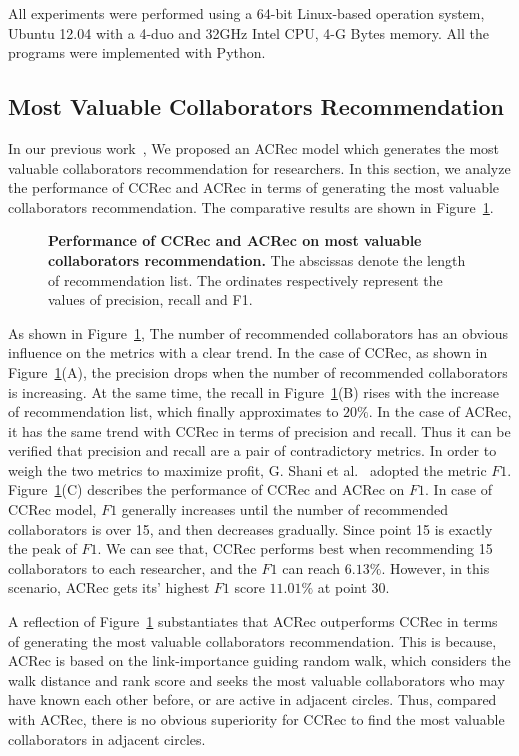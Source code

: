 \documentclass[10pt,letterpaper]{article}
\begin{document}
All experiments were performed using a 64-bit Linux-based operation system, Ubuntu 12.04 with a 4-duo and 32GHz Intel CPU, 4-G Bytes memory. All the programs were implemented with Python.

\subsection*{Most Valuable Collaborators Recommendation}
In our previous work~\cite{li2014acrec}, We proposed an ACRec model which generates the most valuable collaborators recommendation for researchers. In this section, we analyze the performance of CCRec and ACRec in terms of generating the most valuable collaborators recommendation. The comparative results are shown in Figure~\ref{Fig. 3}.

\begin{figure}[!hbt]
\caption{{\bf Performance of CCRec and ACRec on most valuable collaborators recommendation.} The abscissas denote the length of recommendation list. The ordinates respectively represent the values of precision, recall and F1.}
\label{Fig. 3}
\end{figure}

As shown in Figure~\ref{Fig. 3}, The number of recommended collaborators has an obvious influence on the metrics with a clear trend. In the case of CCRec, as shown in Figure~\ref{Fig. 3}(A), the precision drops when the number of recommended collaborators is increasing. At the same time, the recall in Figure~\ref{Fig. 3}(B) rises with the increase of recommendation list, which finally approximates to $20\%$. In the case of ACRec, it has the same trend with CCRec in terms of precision and recall. Thus it can be verified that precision and recall are a pair of contradictory metrics. In order to weigh the two metrics to maximize profit, G. Shani et al.~\cite{shani2011evaluating} adopted the metric $F1$. Figure~\ref{Fig. 3}(C) describes the performance of CCRec and ACRec on $F1$. In case of CCRec model, $F1$ generally increases until the number of recommended collaborators is over 15, and then decreases gradually. Since point 15 is exactly the peak of $F1$. We can see that, CCRec performs best when recommending 15 collaborators to each researcher, and the $F1$ can reach $6.13\%$. However, in this scenario, ACRec gets its' highest $F1$ score $11.01\%$ at point 30.

A reflection of Figure~\ref{Fig. 3} substantiates that ACRec outperforms CCRec in terms of generating the most valuable collaborators recommendation. This is because, ACRec is based on the link-importance guiding random walk, which considers the walk distance and rank score and seeks the most valuable collaborators who may have known each other before, or are active in adjacent circles. Thus, compared with ACRec, there is no obvious superiority for CCRec to find the most valuable collaborators in adjacent circles.
\end{document}
